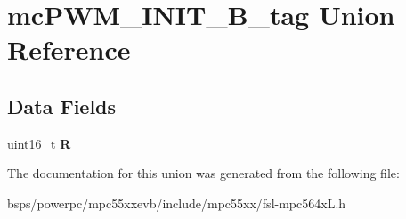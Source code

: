 \hypertarget{unionmcPWM__INIT__16B__tag}{}\section{mc\+P\+W\+M\+\_\+\+I\+N\+I\+T\+\_\+B\+\_\+tag Union Reference}
\label{unionmcPWM__INIT__16B__tag}
\subsection*{Data Fields}
\begin{DoxyCompactItemize}
\item 
\mbox{\label{unionmcPWM__INIT__16B__tag_a2eced6955e1ed29e362cb314ae3af327}} 
uint16\+\_\+t {\bfseries R}
\end{DoxyCompactItemize}


The documentation for this union was generated from the following file\+:\begin{DoxyCompactItemize}
\item 
bsps/powerpc/mpc55xxevb/include/mpc55xx/fsl-\/mpc564x\+L.\+h\end{DoxyCompactItemize}
